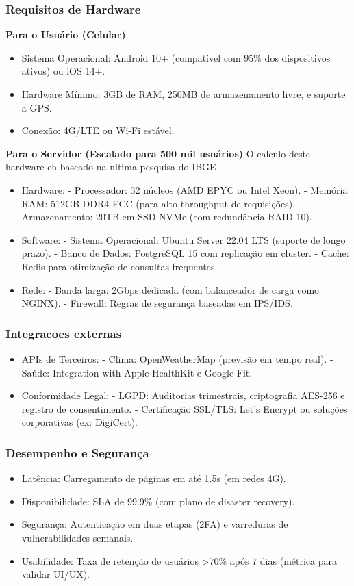 \documentclass[a4paper, 12pt]{article}
\begin{document}
\subsubsection{Requisitos de Hardware}

\textbf{Para o Usuário (Celular)}
\begin{itemize}[]
\item Sistema Operacional: Android 10+ (compatível com 95\% dos dispositivos ativos) ou iOS 14+.
\item Hardware Mínimo: 3GB de RAM, 250MB de armazenamento livre, e suporte a GPS.
\item Conexão: 4G/LTE ou Wi-Fi estável.
\end{itemize}

\textbf{Para o Servidor (Escalado para 500 mil usuários)}
O calculo deste hardware eh baseado na ultima pesquisa do IBGE \cite{ibge-2022}
\begin{itemize}[]
\item Hardware:
- Processador: 32 núcleos (AMD EPYC ou Intel Xeon).
- Memória RAM: 512GB DDR4 ECC (para alto throughput de requisições).
- Armazenamento: 20TB em SSD NVMe (com redundância RAID 10).
\item Software:
- Sistema Operacional: Ubuntu Server 22.04 LTS (suporte de longo prazo).
- Banco de Dados: PostgreSQL 15 com replicação em cluster.
- Cache: Redis para otimização de consultas frequentes.
\item Rede:
- Banda larga: 2Gbps dedicada (com balanceador de carga como NGINX).
- Firewall: Regras de segurança baseadas em IPS/IDS.
\end{itemize}

\subsubsection{Integracoes externas}
\begin{itemize}[]
\item APIs de Terceiros:
- Clima: OpenWeatherMap (previsão em tempo real).
- Saúde: Integration with Apple HealthKit e Google Fit.
\item Conformidade Legal:
- LGPD: Auditorias trimestrais, criptografia AES-256 e registro de consentimento.
- Certificação SSL/TLS: Let's Encrypt ou soluções corporativas (ex: DigiCert).
\end{itemize}

\subsubsection*{Desempenho e Segurança}
\begin{itemize}[]
\item Latência: Carregamento de páginas em até 1.5s (em redes 4G).
\item Disponibilidade: SLA de 99.9\% (com plano de disaster recovery).
\item Segurança: Autenticação em duas etapas (2FA) e varreduras de vulnerabilidades semanais.
\item Usabilidade: Taxa de retenção de usuários >70\% após 7 dias (métrica para validar UI/UX).
\end{itemize}
\end{document}

